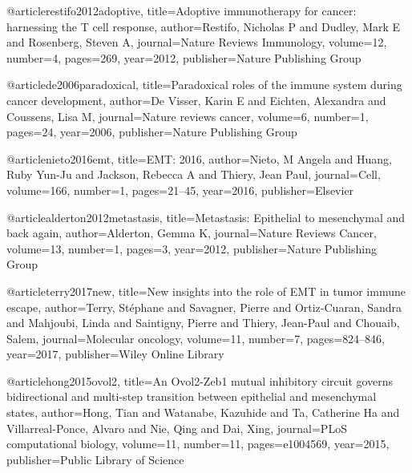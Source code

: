 @article{restifo2012adoptive,
  title={Adoptive immunotherapy for cancer: harnessing the T cell response},
  author={Restifo, Nicholas P and Dudley, Mark E and Rosenberg, Steven A},
  journal={Nature Reviews Immunology},
  volume={12},
  number={4},
  pages={269},
  year={2012},
  publisher={Nature Publishing Group}
}

@article{de2006paradoxical,
  title={Paradoxical roles of the immune system during cancer development},
  author={De Visser, Karin E and Eichten, Alexandra and Coussens, Lisa M},
  journal={Nature reviews cancer},
  volume={6},
  number={1},
  pages={24},
  year={2006},
  publisher={Nature Publishing Group}
}

@article{nieto2016emt,
  title={EMT: 2016},
  author={Nieto, M Angela and Huang, Ruby Yun-Ju and Jackson, Rebecca A and Thiery, Jean Paul},
  journal={Cell},
  volume={166},
  number={1},
  pages={21--45},
  year={2016},
  publisher={Elsevier}
}

@article{alderton2012metastasis,
  title={Metastasis: Epithelial to mesenchymal and back again},
  author={Alderton, Gemma K},
  journal={Nature Reviews Cancer},
  volume={13},
  number={1},
  pages={3},
  year={2012},
  publisher={Nature Publishing Group}
}

@article{terry2017new,
  title={New insights into the role of EMT in tumor immune escape},
  author={Terry, St{\'e}phane and Savagner, Pierre and Ortiz-Cuaran, Sandra and Mahjoubi, Linda and Saintigny, Pierre and Thiery, Jean-Paul and Chouaib, Salem},
  journal={Molecular oncology},
  volume={11},
  number={7},
  pages={824--846},
  year={2017},
  publisher={Wiley Online Library}
}

@article{hong2015ovol2,
  title={An Ovol2-Zeb1 mutual inhibitory circuit governs bidirectional and multi-step transition between epithelial and mesenchymal states},
  author={Hong, Tian and Watanabe, Kazuhide and Ta, Catherine Ha and Villarreal-Ponce, Alvaro and Nie, Qing and Dai, Xing},
  journal={PLoS computational biology},
  volume={11},
  number={11},
  pages={e1004569},
  year={2015},
  publisher={Public Library of Science}
}